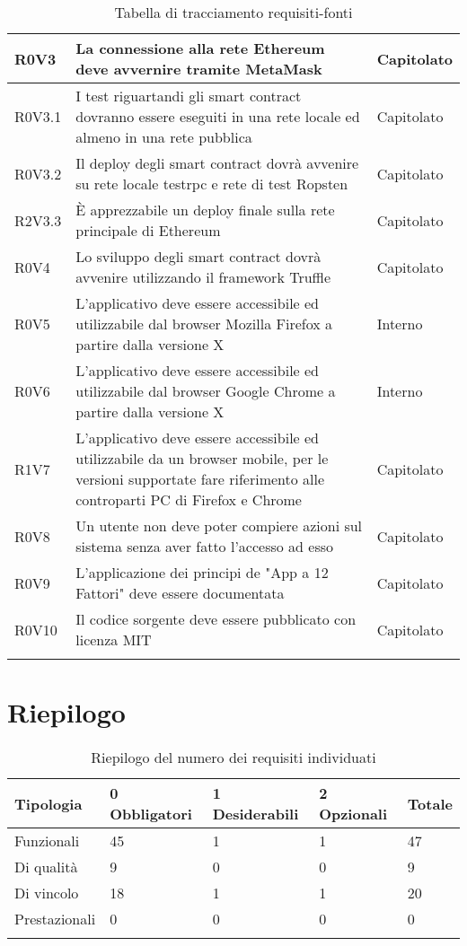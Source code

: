 \documentclass[AnalisiDeiRequisiti.tex]{subfiles}
\begin{document}
\begin{longtable}[H]{|p{2cm}|p{5cm}|p{5cm}|}
	R0V3 &  La connessione alla rete Ethereum deve avvernire tramite MetaMask & Capitolato \\ \hline
	R0V3.1 &  I test riguartandi gli smart contract dovranno essere eseguiti in una rete locale ed almeno in una rete pubblica & Capitolato \\ \hline
	R0V3.2 &  Il deploy degli smart contract dovrà avvenire su rete locale testrpc e rete di test Ropsten & Capitolato \\ \hline
	R2V3.3 &  È apprezzabile un deploy finale sulla rete principale di Ethereum & Capitolato \\ \hline
	R0V4 &  Lo sviluppo degli smart contract dovrà avvenire utilizzando il framework Truffle & Capitolato \\ \hline
	R0V5 &  L'applicativo deve essere accessibile ed utilizzabile dal browser Mozilla Firefox a partire dalla versione X & Interno \\ \hline
	R0V6 &  L'applicativo deve essere accessibile ed utilizzabile dal browser Google Chrome a partire dalla versione X & Interno \\ \hline
	R1V7 &  L'applicativo deve essere accessibile ed utilizzabile da un browser mobile, per le versioni supportate fare riferimento alle controparti PC di Firefox e Chrome & Capitolato \\ \hline
	R0V8 &  Un utente non deve poter compiere azioni sul sistema senza aver fatto l'accesso ad esso & Capitolato \\ \hline
	R0V9 &  L'applicazione dei principi de "App a 12 Fattori" deve essere documentata & Capitolato \\ \hline
	R0V10 &  Il codice sorgente deve essere pubblicato con licenza MIT & Capitolato \\ \hline
	\caption{Tabella di tracciamento requisiti-fonti}
\end{longtable}

\section{Riepilogo}

\label{table:Riepilogo del numero dei requisiti individuati}
\begin{longtable}[H]{|p{2.8cm}|p{2.9cm}|p{2.9cm}|p{2.9cm}|p{1.5cm}|}
	\hline
	\rowcolor[HTML]{38FFF8} 
	\textbf{Tipologia} & \textbf{0 Obbligatori} & \textbf{1 Desiderabili} & \textbf{2 Opzionali} & \textbf{Totale} \\ \hline
	Funzionali & 45 & 1 & 1 & 47 \\ \hline
	Di qualità & 9 & 0 & 0 & 9 \\ \hline
	Di vincolo & 18 & 1 & 1 & 20 \\ \hline
	Prestazionali & 0 & 0 & 0 & 0 \\ \hline
	
	\caption{Riepilogo del numero dei requisiti individuati}
\end{longtable}
\end{document}
